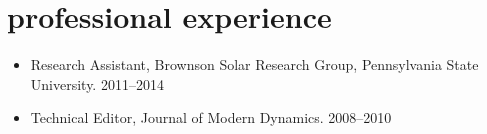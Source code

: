 \documentclass[11pt,article,oneside]{memoir}
\begin{document}

\section{professional experience}

\mbox{}\vspace{-\dimexpr\baselineskip\relax}

\begin{itemize}[label={}]

\item Research Assistant, Brownson Solar Research Group, Pennsylvania State University. 2011--2014

\item Technical Editor, Journal of Modern Dynamics. 2008--2010

\end{itemize}
\end{document}
